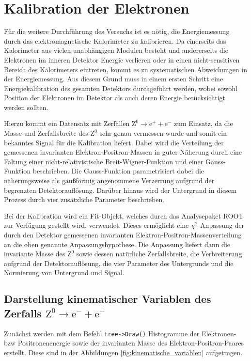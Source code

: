 \documentclass[11pt, a4paper]{article}
\numberwithin{equation}{section}
\begin{document}
\section{Kalibration der Elektronen}

Für die weitere Durchführung des Versuchs ist es nötig, die Energiemessung durch das elektromagnetische Kalorimeter zu kalibrieren.
Da einerseits das Kalorimeter aus vielen unabhängigen Modulen besteht und andererseits die Elektronen im inneren Detektor Energie verlieren oder in einen nicht-sensitiven Bereich des Kalorimeters eintreten, kommt es zu systematischen Abweichungen in der Energiemessung.
Aus diesem Grund muss in einem ersten Schritt eine Energiekalibration des gesamten Detektors durchgeführt werden, wobei sowohl Position der Elektronen im Detektor als auch deren Energie berücksichtigt werden sollten.

Hierzu kommt ein Datensatz mit Zerfällen $\mathrm{Z}^0 \rightarrow \mathrm{e}^+ + \mathrm{e}^-$ zum Einsatz, da die Masse und Zerfallsbreite des $\mathrm{Z}^0$ sehr genau vermessen wurde und somit ein bekanntes Signal für die Kalibration liefert.
Dabei wird die Verteilung der gemessenen invarianten Elektron-Positron-Massen in guter Näherung durch eine Faltung einer nicht-relativistische Breit-Wigner-Funktion und einer Gauss-Funktion beschrieben.
Die Gauss-Funktion parametrisiert dabei die näherungsweise als gaußförmig angenommene Verzerrung aufgrund der begrenzten Detektorauflösung.
Darüber hinaus wird der Untergrund in diesem Prozess durch vier zusätzliche Parameter beschrieben.

Bei der Kalibration wird ein Fit-Objekt, welches durch das Analysepaket ROOT zur Verfügung gestellt wird, verwendet.
Dieses ermöglicht eine $\chi^2$-Anpassung der durch den Detektor gemessenen invarianten  Elektron-Positron-Massenverteilung an die oben genannte Anpassungshypothese.
Die Anpassung liefert dann die invariante Masse des $\mathrm{Z}^0$ sowie dessen natürliche Zerfallsbreite, die Verbreiterung aufgrund der Detektorauflösung, die vier Parameter des Untergrunds und die Normierung von Untergrund und Signal.

\subsection{Darstellung kinematischer Variablen des Zerfalls $\mathrm{Z}^0 \rightarrow \mathrm{e}^- + \mathrm{e}^+$}

Zunächst werden mit dem Befehl \texttt{tree->Draw()} Histogramme der Elektronen- bzw Positronenenergie sowie der invarianten Masse des Elektron-Positron-Paares erstellt.
Diese sind in der Abbildungen \ref{fig:kinematische_variablen} aufgetragen.
\end{document}
